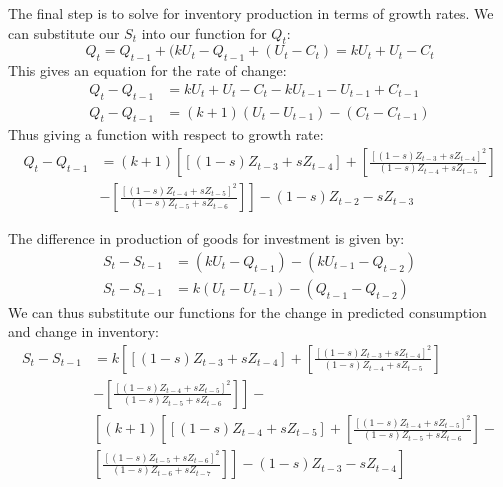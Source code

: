 The final step is to solve for inventory production in terms of growth rates. We can substitute our $S_t$ into our function for $Q_t$:
\begin{equation*}
    Q_t=Q_{t-1}+(kU_t-Q_{t-1}+(U_t-C_t)=kU_t+U_t-C_t
\end{equation*}
This gives an equation for the rate of change:
\begin{align*}
    Q_t-Q_{t-1}&=kU_t+U_t-C_t-kU_{t-1}-U_{t-1}+C_{t-1}\\
    Q_t-Q_{t-1}&=(k+1)(U_t-U_{t-1})-(C_t-C_{t-1})
\end{align*}
Thus giving a function with respect to growth rate:
\begin{equation}
\begin{split}
    Q_t-Q_{t-1}& = (k+1)\left[[(1-s)Z_{t-3}+sZ_{t-4}]+\left[\frac{[(1-s)Z_{t-3}+sZ_{t-4}]^2}{(1-s)Z_{t-4}+sZ_{t-5}}\right]\right.\\
    &\left.-\left[\frac{[(1-s)Z_{t-4}+sZ_{t-5}]^2}{(1-s)Z_{t-5}+sZ_{t-6}}\right]\right]-(1-s)Z_{t-2}-sZ_{t-3}
\end{split}
\end{equation}

The difference in production of goods for investment is given by:
\begin{align*}
    S_t-S_{t-1}& =(kU_t-Q_{t-1})-(kU_{t-1}-Q_{t-2})\\
    S_t-S_{t-1}& = k(U_t-U_{t-1})-(Q_{t-1}-Q_{t-2})
\end{align*}
We can thus substitute our functions for the change in predicted consumption and change in inventory:
\begin{equation}
\begin{split}
    S_t-S_{t-1}& =k\left[[(1-s)Z_{t-3}+sZ_{t-4}]+\left[\frac{[(1-s)Z_{t-3}+sZ_{t-4}]^2}{(1-s)Z_{t-4}+sZ_{t-5}}\right]\right.\\
    & \left.-\left[\frac{[(1-s)Z_{t-4}+sZ_{t-5}]^2}{(1-s)Z_{t-5}+sZ_{t-6}}\right]\right]-\\
    & \left[(k+1)\left[[(1-s)Z_{t-4}+sZ_{t-5}]+\left[\frac{[(1-s)Z_{t-4}+sZ_{t-5}]^2}{(1-s)Z_{t-5}+sZ_{t-6}}\right]-\right.\right.\\
    & \left.\left.\left[\frac{[(1-s)Z_{t-5}+sZ_{t-6}]^2}{(1-s)Z_{t-6}+sZ_{t-7}}\right]\right]-(1-s)Z_{t-3}-sZ_{t-4}\right]
\end{split}
\end{equation}

